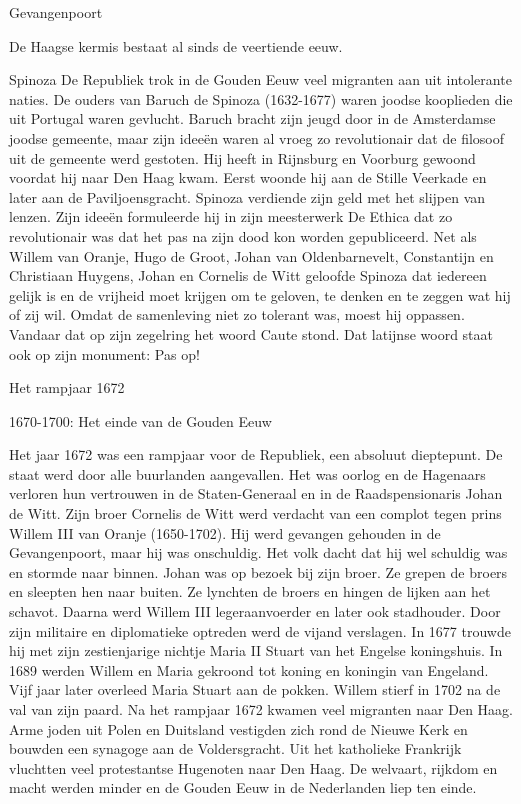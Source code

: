 \documentclass[
  a4paper,
]{book}
\begin{document}
Gevangenpoort

De Haagse kermis bestaat al sinds de veertiende eeuw.

Spinoza
De Republiek trok in de Gouden Eeuw veel migranten aan uit intolerante naties. De ouders van Baruch de Spinoza (1632-1677) waren joodse kooplieden die uit Portugal waren gevlucht. Baruch bracht zijn jeugd door in de Amsterdamse joodse gemeente, maar zijn ideeën waren al vroeg zo revolutionair dat de filosoof uit de gemeente werd gestoten. Hij heeft in Rijnsburg en Voorburg gewoond voordat hij naar Den Haag kwam. Eerst woonde hij aan de Stille Veerkade en later aan de Paviljoensgracht. Spinoza verdiende zijn geld met het slijpen van lenzen. Zijn ideeën formuleerde hij in zijn meesterwerk De Ethica dat zo revolutionair was dat het pas na zijn dood kon worden gepubliceerd. Net als Willem van Oranje, Hugo de Groot, Johan van Oldenbarnevelt, Constantijn en Christiaan Huygens, Johan en Cornelis de Witt geloofde Spinoza dat iedereen gelijk is en de vrijheid moet krijgen om te geloven, te denken en te zeggen wat hij of zij wil. Omdat de samenleving niet zo tolerant was, moest hij oppassen. Vandaar dat op zijn zegelring het woord Caute stond. Dat latijnse woord staat ook op zijn monument: Pas op!

Het rampjaar 1672

1670-1700: Het einde van de Gouden Eeuw

Het jaar 1672 was een rampjaar voor de Republiek, een absoluut dieptepunt.
De staat werd door alle buurlanden aangevallen.
Het was oorlog en de Hagenaars verloren hun vertrouwen in de Staten-Generaal en in
de Raadspensionaris Johan de Witt.
Zijn broer Cornelis de Witt werd verdacht van een complot tegen prins Willem III van Oranje (1650-1702).
Hij werd gevangen gehouden in de Gevangenpoort, maar hij was onschuldig.
Het volk dacht dat hij wel schuldig was en stormde naar binnen.
Johan was op bezoek bij zijn broer.
Ze grepen de broers en sleepten hen naar buiten.
Ze lynchten de broers en hingen de lijken aan het schavot.
Daarna werd Willem III legeraanvoerder en later ook stadhouder.
Door zijn militaire en diplomatieke optreden werd de vijand verslagen.
In 1677 trouwde hij met zijn zestienjarige nichtje Maria II Stuart van het Engelse koningshuis.
In 1689 werden Willem en Maria gekroond tot koning en koningin van Engeland.
Vijf jaar later overleed Maria Stuart aan de pokken.
Willem stierf in 1702 na de val van zijn paard.
Na het rampjaar 1672 kwamen veel migranten naar Den Haag.
Arme joden uit Polen en Duitsland vestigden zich rond de Nieuwe Kerk en bouwden een synagoge aan de Voldersgracht.
Uit het katholieke Frankrijk vluchtten veel protestantse Hugenoten naar Den Haag.
De welvaart, rijkdom en macht werden minder en de Gouden Eeuw in de Nederlanden liep ten einde.
\end{document}
